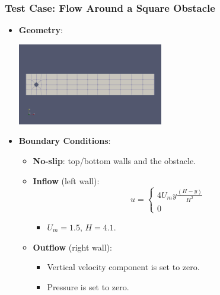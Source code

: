 \documentclass{settings/laserbeam}
\begin{document}
\begin{frame}
    
    \frametitle{Test Case: Flow Around a Square Obstacle}

    \begin{itemize}
    \item \textbf{Geometry}:
    \begin{center}
        \includegraphics[width=0.5\textwidth]{images/test_geometry.png}
    \end{center}
    \item \textbf{Boundary Conditions}:
    \begin{itemize}
        \item \textbf{No-slip}: top/bottom walls and the obstacle.
        \item \textbf{Inflow} (left wall):
        $$
        u = \begin{cases}
            4U_my\frac{(H-y)}{H^2} \\
            0
        \end{cases}
        $$
        \begin{itemize}
            \item $U_m=1.5$, $H=4.1$.
        \end{itemize}
        \item \textbf{Outflow} (right wall):
        \begin{itemize}
            \item Vertical velocity component is set to zero.
            \item Pressure is set to zero.
        \end{itemize}
    \end{itemize}
    \end{itemize}
    
\end{frame}
\end{document}
